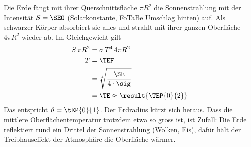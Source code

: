 \begin{center}
\end{center}

Die Erde fängt mit ihrer Querschnittsfläche $\pi R^2$ die Sonnenstrahlung mit der Intensität $S = \SEO$ (Solarkonstante, FoTaBe Umschlag hinten) auf. Als schwarzer Körper absorbiert sie alles und strahlt mit ihrer ganzen Oberfläche $4\pi R^2$ wieder ab. Im Gleichgewicht gilt
\begin{align}
 S\,\pi R^2 &= \sigma\,T^4\,4\pi R^2 \\
 T &= \TEF \\
   &= \sqrt[4]{\frac{\SE}{4\cdot\sig}} \\
   &= \TE \approx \result{\TEP{0}{2}}
\end{align}
Das entspricht $\vartheta = \tEP{0}{1}$. Der Erdradius kürzt sich heraus. Dass die mittlere Oberflächentemperatur trotzdem etwa so gross ist, ist Zufall: Die Erde reflektiert rund ein Drittel der Sonnenstrahlung (Wolken, Eis), dafür hält der Treibhauseffekt der Atmosphäre die Oberfläche wärmer.
